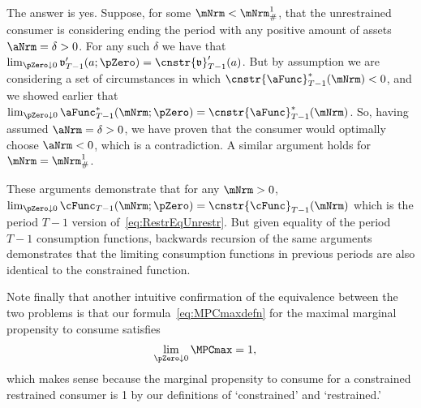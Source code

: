\documentclass[\econtexRoot/BufferStockTheory]{subfiles}
\begin{document}
The answer is yes.
Suppose, for some $\mNrm < \mNrm^{1}_{\#}$, that the unrestrained consumer is considering ending the period with any positive amount of assets $\aNrm=\delta > 0$.
For any such $\delta$ we have that $\lim_{\pZero \downarrow 0} \mathfrak{v}_{T-1}^{\prime}(a;\pZero)=\cnstr{\mathfrak{v}}_{T-1}^{\prime}(a)$.
But by assumption we are considering a set of circumstances in which $\cnstr{\aFunc}_{T-1}^{*}(\mNrm) < 0$, and we showed earlier that $\lim_{\pZero \downarrow 0} \aFunc_{T-1}^{*}(\mNrm;\pZero) = \cnstr{\aFunc}_{T-1}^{*}(\mNrm)$.
So, having assumed $\aNrm = \delta > 0$, we have proven that the consumer would optimally choose $\aNrm < 0$, which is a contradiction.
A similar argument holds for $\mNrm = \mNrm^{1}_{\#}$.

These arguments demonstrate that for any $\mNrm>0$, $\lim_{\pZero \downarrow 0} \cFunc_{T-1}(\mNrm;\pZero) = \cnstr{\cFunc}_{T-1}(\mNrm)$ which is the period $T-1$ version of~\eqref{eq:RestrEqUnrestr}.
But given equality of the period $T-1$ consumption functions, backwards recursion of the same arguments demonstrates that the limiting consumption functions in previous periods are also identical to the constrained function.

Note finally that another intuitive confirmation of the equivalence between the two problems is that our formula~\eqref{eq:MPCmaxdefn} for the maximal marginal propensity to consume satisfies
\begin{eqnarray*}
  \lim_{\pZero \downarrow 0} \MPCmax  & = 1,
\end{eqnarray*}
which makes sense because the marginal propensity to consume for a constrained restrained consumer is 1 by our definitions of `constrained' and `restrained.'

\end{document}
